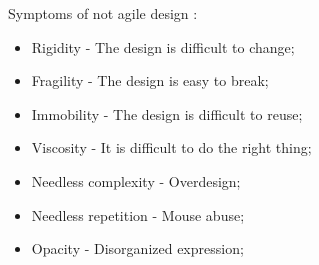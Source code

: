 Symptoms of not agile design \cite{MartinASD}:
\begin{itemize}
	\item Rigidity - The design is difficult to change;
	\item Fragility - The design is easy to break;
	\item Immobility - The design is difficult to reuse;
	\item Viscosity - It is difficult to do the right thing;
	\item Needless complexity - Overdesign;
	\item Needless repetition - Mouse abuse;
	\item Opacity - Disorganized expression;
\end{itemize}


